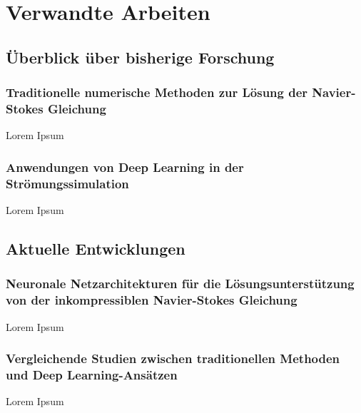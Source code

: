 \section{Verwandte Arbeiten}
\subsection{Überblick über bisherige Forschung}
\subsubsection{Traditionelle numerische Methoden zur Lösung der Navier-Stokes Gleichung}
Lorem Ipsum

\subsubsection{Anwendungen von Deep Learning in der Strömungssimulation}
Lorem Ipsum

\subsection{Aktuelle Entwicklungen}
\subsubsection{Neuronale Netzarchitekturen für die Lösungsunterstützung von der inkompressiblen Navier-Stokes Gleichung}
Lorem Ipsum

\subsubsection{Vergleichende Studien zwischen traditionellen Methoden und Deep Learning-Ansätzen}
Lorem Ipsum